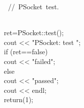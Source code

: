 \documentclass{article}
\begin{document}
{         
\hbox{// PSocket test.}\strut\\
         ret=PSocket::test();
\\
         cout << "PSocket: test ";
\\
         if (ret==false)
\\
                 cout << "failed";
\\
         else 
\\
                 cout << "passed";
\\
         cout << endl;
\\
         return(1);
\\
 }
\\
\end{document}
